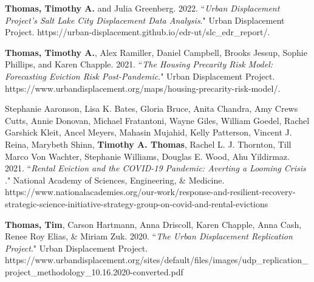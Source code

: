 

\begin{cvparagraph}

\textbf{Thomas, Timothy A.} and Julia Greenberg. 2022. “\emph{Urban Displacement Project’s Salt Lake City Displacement Data Analysis}." Urban Displacement Project. https://urban-displacement.github.io/edr-ut/slc\_edr\_report/.
\end{cvparagraph}

\begin{cvparagraph}

\textbf{Thomas, Timothy A.}, Alex Ramiller, Daniel Campbell, Brooks Jessup, Sophie Phillips, and Karen Chapple. 2021. “\emph{The Housing Precarity Risk Model: Forecasting Eviction Risk Post-Pandemic}." Urban Displacement Project. https://www.urbandisplacement.org/maps/housing-precarity-risk-model/.
\end{cvparagraph}


\begin{cvparagraph}

Stephanie Aaronson, Lisa K. Bates, Gloria Bruce, Anita Chandra, Amy Crews Cutts, Annie Donovan, Michael Fratantoni, Wayne Giles, William Goedel, Rachel Garshick Kleit, Ancel Meyers, Mahasin Mujahid, Kelly Patterson, Vincent J. Reina, Marybeth Shinn, \textbf{Timothy A. Thomas}, Rachel L. J. Thornton, Till Marco Von Wachter, Stephanie Williams, Douglas E. Wood, Ahu Yildirmaz. 2021. “\emph{Rental Eviction and the COVID-19 Pandemic: Averting a Looming Crisis}
." National Academy of Sciences, Engineering, \& Medicine. https://www.nationalacademies.org/our-work/response-and-resilient-recovery-strategic-science-initiative-strategy-group-on-covid-and-rental-evictions
\end{cvparagraph}

\begin{cvparagraph}

\textbf{Thomas, Tim}, Carson Hartmann, Anna Driscoll, Karen Chapple, Anna Cash, Renee Roy Elias, \& Miriam Zuk. 2020. “\emph{The Urban Displacement Replication Project}." Urban Displacement Project. https://www.urbandisplacement.org/sites/default/files/images/\newline udp\_replication\_project\_methodology\_10.16.2020-converted.pdf
\end{cvparagraph}

